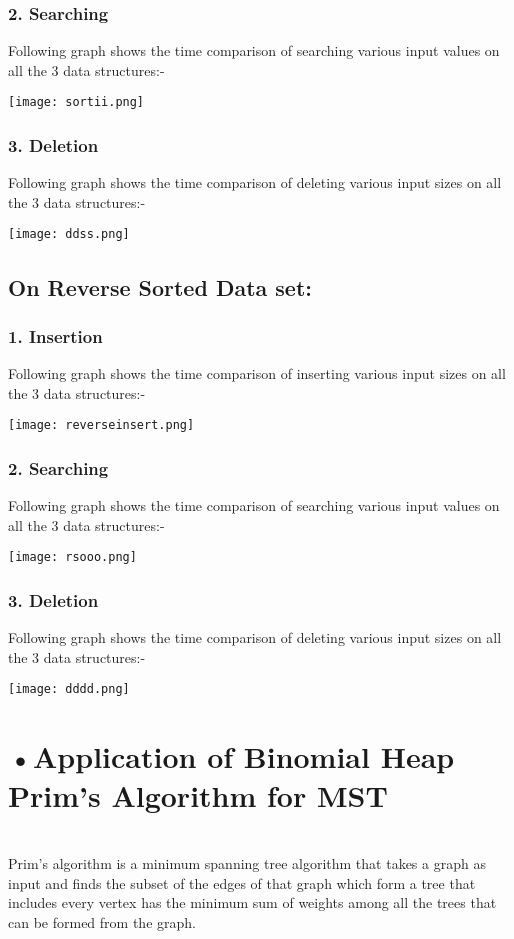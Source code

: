 \documentclass[10pt,a4paper]{article} ,
\begin{document}
\subsubsection*{2. Searching}

Following graph shows the time comparison of searching various input values on all the 3 data structures:-


\texttt{[image: sortii.png]}  

\subsubsection*{3. Deletion}

Following graph shows the time comparison of deleting various input sizes on all the 3 data structures:-


\texttt{[image: ddss.png]} 

\subsection*{On Reverse Sorted Data set:}

\subsubsection*{1. Insertion}

Following graph shows the time comparison of inserting various input sizes on all the 3 data structures:-
 

\texttt{[image: reverseinsert.png]}  

\subsubsection*{2. Searching}

Following graph shows the time comparison of searching various input values on all the 3 data structures:-


\texttt{[image: rsooo.png]}  

\subsubsection*{3. Deletion}

Following graph shows the time comparison of deleting various input sizes on all the 3 data structures:-


\texttt{[image: dddd.png]} 


\section*{•Application of Binomial Heap \\ Prim's Algorithm for MST} \\
	Prim's algorithm is a minimum spanning tree algorithm that takes a graph as input and finds the subset of the edges of that graph which form a tree that includes every vertex
has the minimum sum of weights among all the trees that can be formed from the graph.\\ \\
\end{document}
